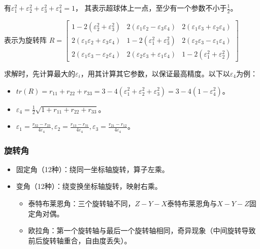 \documentclass[
12pt, %
a4paper, 
oneside, %
headinclude,footinclude, %
]{scrartcl}
\begin{document}
有$ \varepsilon_1^2 + \varepsilon_2^2 + \varepsilon_3^2 + \varepsilon_4^2 = 1 $，
其表示超球体上一点，至少有一个参数不小于$ \frac{1}{2} $。

表示为旋转阵
$ 
R =
\begin{bmatrix}
1 - 2(\varepsilon_2^2 + \varepsilon_3^2) & 2(\varepsilon_1 \varepsilon_2 - \varepsilon_3 \varepsilon_4) & 2(\varepsilon_1 \varepsilon_3 + \varepsilon_2 \varepsilon_4) \\
2(\varepsilon_1 \varepsilon_2 + \varepsilon_3 \varepsilon_4) & 1 - 2(\varepsilon_1^2 + \varepsilon_3^2) & 2(\varepsilon_2 \varepsilon_3 - \varepsilon_1 \varepsilon_4) \\
2(\varepsilon_1 \varepsilon_3 - \varepsilon_2 \varepsilon_4) & 2(\varepsilon_2 \varepsilon_3 + \varepsilon_1 \varepsilon_4) & 1 - 2(\varepsilon_1^2 + \varepsilon_2^2)
\end{bmatrix} 
$

求解时，先计算最大的$ \varepsilon_i $，用其计算其它参数，以保证最高精度。以下以$ \varepsilon_4 $为例：
\begin{itemize}
\item $ tr(R) = r_{11} + r_{22} + r_{33} = 3 - 4(\varepsilon_1^2 + \varepsilon_2^2 + \varepsilon_3^2) = 3 - 4(1 - \varepsilon_4^2) $。
\item $ \varepsilon_4 = \frac{1}{2} \sqrt{1 + r_{11} + r_{22} + r_{33}} $。
\item $ \varepsilon_1 = \frac{r_{32} - r_{23}}{4 \varepsilon_4}, \varepsilon_2 = \frac{r_{13} - r_{31}}{4 \varepsilon_4}, \varepsilon_3 = \frac{r_{21} - r_{12}}{4 \varepsilon_4} $。
\end{itemize}
\subsubsection{旋转角}
\begin{itemize}
\item 固定角（12种）：绕同一坐标轴旋转，算子左乘。
\item 变角（12种）：绕变换坐标轴旋转，映射右乘。
\begin{itemize}
\item 泰特布莱恩角：三个旋转轴不同，$ Z-Y-X $泰特布莱恩角与$ X-Y-Z $固定角对偶。
\item 欧拉角：第一个旋转轴与最后一个旋转轴相同，奇异现象（中间旋转导致前后旋转轴重合，自由度丢失）。
\end{itemize}
\end{itemize}
\end{document}
